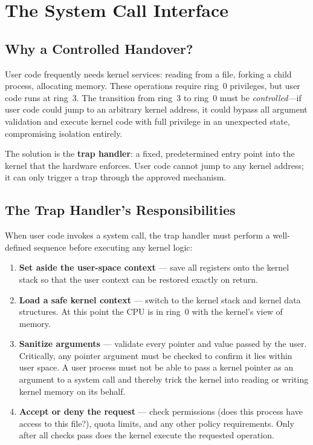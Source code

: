 \documentclass[11pt]{article}
\begin{document}
\section{The System Call Interface}

\subsection{Why a Controlled Handover?}

User code frequently needs kernel services: reading from a file, forking a child process,
allocating memory. These operations require ring~0 privileges, but user code runs at ring~3.
The transition from ring~3 to ring~0 must be \emph{controlled}---if user code could jump
to an arbitrary kernel address, it could bypass all argument validation and execute kernel
code with full privilege in an unexpected state, compromising isolation entirely.

The solution is the \textbf{trap handler}: a fixed, predetermined entry point into the
kernel that the hardware enforces. User code cannot jump to any kernel address; it can only
trigger a trap through the approved mechanism.

\subsection{The Trap Handler's Responsibilities}

When user code invokes a system call, the trap handler must perform a well-defined sequence
before executing any kernel logic:

\begin{enumerate}
    \item \textbf{Set aside the user-space context} --- save all registers onto the kernel
          stack so that the user context can be restored exactly on return.
    \item \textbf{Load a safe kernel context} --- switch to the kernel stack and kernel data
          structures. At this point the CPU is in ring~0 with the kernel's view of memory.
    \item \textbf{Sanitize arguments} --- validate every pointer and value passed by the
          user. Critically, any pointer argument must be checked to confirm it lies within
          user space. A user process must not be able to pass a kernel pointer as an argument
          to a system call and thereby trick the kernel into reading or writing kernel memory
          on its behalf.
    \item \textbf{Accept or deny the request} --- check permissions (does this process have
          access to this file?), quota limits, and any other policy requirements. Only after
          all checks pass does the kernel execute the requested operation.
\end{enumerate}
\end{document}
